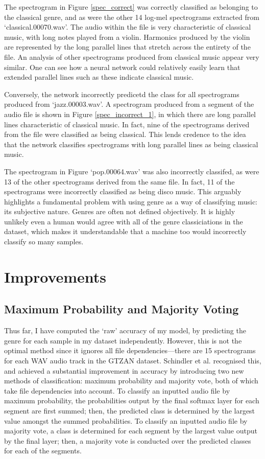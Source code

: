 \documentclass[conference]{IEEEtran}
\begin{document}
The spectrogram in Figure \ref{spec_correct} was correctly classified as belonging to the classical genre, and as were the other 14 log-mel spectrograms extracted from `classical.00070.wav'.
The audio within the file is very characteristic of classical music, with long notes played from a violin.
Harmonics produced by the violin are represented by the long parallel lines that stretch across the entirety of the file.
An analysis of other spectrograms produced from classical music appear very similar.
One can see how a neural network could relatively easily learn that extended parallel lines such as these indicate classical music.

Conversely, the network incorrectly predicetd the class for all spectrograms produced from `jazz.00003.wav'.
A spectrogram produced from a segment of the audio file is shown in Figure \ref{spec_incorrect_1}, in which there are long parallel lines characteristic of classical music.
In fact, nine of the spectrograms derived from the file were classified as being classical.
This lends credence to the idea that the network classifies spectrograms with long parallel lines as being classical music.

The spectrogram in Figure `pop.00064.wav' was also incorrectly classifed, as were 13 of the other spectrograms derived from the same file.
In fact, 11 of the spectrograms were incorrectly classified as being disco music.
This arguably highlights a fundamental problem with using genre as a way of classifying music: its subjective nature.
Genres are often not defined objectively.
It is highly unlikely even a human would agree with all of the genre classiciations in the dataset, which makes it understandable that a machine too would incorrectly classify so many samples.

\section{Improvements}

\subsection{Maximum Probability and Majority Voting}

Thus far, I have computed the `raw' accuracy of my model, by predicting the genre for each sample in my dataset independently.
However, this is not the optimal method since it ignores all file dependencies---there are 15 spectrograms for each WAV audio track in the GTZAN dataset.
Schindler et al. recognised this, and achieved a substantial improvement in accuracy by introducing two new methods of classification: maximum probability and majority vote, both of which take file dependencies into account.
To classify an inputted audio file by maximum probability, the probabilities output by the final softmax layer for each segment are first summed; then, the predicted class is determined by the largest value amongst the summed probabilities.
To classify an inputted audio file by majority vote, a class is determined for each segment by the largest value output by the final layer; then, a majority vote is conducted over the predicted classes for each of the segments.
\end{document}
